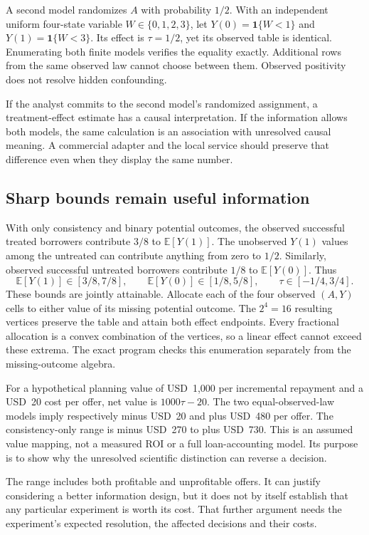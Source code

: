 A second model randomizes $A$ with probability $1/2$. With an independent
uniform four-state variable $W\in\{0,1,2,3\}$, let
$Y(0)=\mathbf 1\{W<1\}$ and $Y(1)=\mathbf 1\{W<3\}$.
Its effect is $\tau=1/2$, yet its observed table is identical. Enumerating
both finite models verifies the equality exactly. Additional rows from the
same observed law cannot choose between them. Observed positivity does not
resolve hidden confounding.

If the analyst commits to the second model's randomized assignment, a
treatment-effect estimate has a causal interpretation. If the information
allows both models, the same calculation is an association with unresolved
causal meaning. A commercial adapter and the local service should preserve
that difference even when they display the same number.

\subsection{Sharp bounds remain useful information}

With only consistency and binary potential outcomes, the observed successful
treated borrowers contribute $3/8$ to $\mathbb E[Y(1)]$. The unobserved
$Y(1)$ values among the untreated can contribute anything from zero to $1/2$.
Similarly, observed successful untreated borrowers contribute $1/8$ to
$\mathbb E[Y(0)]$. Thus
\[
 \mathbb E[Y(1)]\in[3/8,7/8],\qquad
 \mathbb E[Y(0)]\in[1/8,5/8],\qquad
 \tau\in[-1/4,3/4].
\]
These bounds are jointly attainable. Allocate each of the four observed
$(A,Y)$ cells to either value of its missing potential outcome. The $2^4=16$
resulting vertices preserve the table and attain both effect endpoints.
Every fractional allocation is a convex combination of the vertices, so a
linear effect cannot exceed these extrema. The exact program checks this
enumeration separately from the missing-outcome algebra.

For a hypothetical planning value of USD~1,000 per incremental repayment and
a USD~20 cost per offer, net value is $1000\tau-20$. The two equal-observed-law
models imply respectively minus USD~20 and plus USD~480 per offer. The
consistency-only range is minus USD~270 to plus USD~730. This is an assumed
value mapping, not a measured ROI or a full loan-accounting model. Its purpose
is to show why the unresolved scientific distinction can reverse a decision.

The range includes both profitable and unprofitable offers. It can justify
considering a better information design, but it does not by itself establish
that any particular experiment is worth its cost. That further argument needs
the experiment's expected resolution, the affected decisions and their costs.

